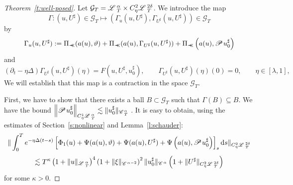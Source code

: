 \documentclass{amsart}
\newcommand{\assign}{:=}
\newcommand{\mathd}{\mathrm{d}}
\newcommand{\precprec}{\prec\!\!\!\prec}
\theoremstyle{remark}
\theoremstyle{definition}
\newcommand{\CC}{\mathscr{C} \hspace{.1em}}
\newcommand{\LL}{\mathscr{L} \hspace{.2em}}
\newcommand{\PP}{\mathscr{P} \hspace{.1em}}
\begin{document}
\begin{proof}[Theorem~\ref{t:well-posed}]
  Let $\mathcal{G}_T = \LL^{\alpha}_T \times C_{\eta}^2 \LL^{2 \delta}_T$. We
  introduce the map
  \[ \Gamma : (u, U^{\sharp}) \in \mathcal{G}_T \mapsto (\Gamma_u (u,
     U^{\sharp}), \Gamma_{U^{\sharp}} (u, U^{\sharp})) \in \mathcal{G}_T \]
  by
  \[ \Gamma_u (u, U^{\sharp}) \assign \Pi_{\precprec} (a (u), \vartheta) +
     \Pi_{\precprec} (a (u), \Gamma_{U^{\sharp}} (u, U^{\sharp})) +
     \Pi_{\precprec} \left( a (u), \PP u_0^{\sharp} \right) \]
  and
  \[ (\partial_t - \eta \Delta) \Gamma_{U^{\sharp}} (u, U^{\sharp}) (\eta) = F
     (u, U^{\sharp}, u_0^{\sharp}), \qquad \Gamma_{U^{\sharp}} (u, U^{\sharp})
     (\eta) (0) = 0, \qquad \eta \in [\lambda, 1], \]
  We will establish that this map is a contraction in the space $\mathcal{G}_T
  .$
  
  First, we have to show that there exists a ball $B \subset \mathcal{G}_T$
  such that $\Gamma (B) \subseteq B$. We have the bound $\left\| \PP
  u_0^{\sharp} \right\|_{C^1_{\eta} \LL^{\alpha}_T} \lesssim \| u^{\sharp}_0
  \|_{\CC^{\alpha}_T}$ . It is easy to obtain, using the estimates of
  Section~\ref{s:nonlinear} and Lemma~\ref{l:schauder}:
  \[ \| \int_0^T e^{- \eta \Delta (t - s)} \left[ \Phi_1 (u) + \Psi (a (u),
     \vartheta) + \Psi (a (u), U^{\sharp}) + \Psi \left( a (u), \PP
     u_0^{\sharp} \right) \right]_s \mathd s\|_{C^2_{\eta} \LL_T^{2 \delta}}
  \]
  \[ \lesssim T^{\kappa} \left( 1 + \| u \|_{\LL^{\alpha}_T} \right)^4 \left(
     1 + \| \xi \|_{\CC^{\alpha - 2}} \right)^2 \| u_0^{\sharp}
     \|_{\CC^{\alpha}} \left( 1 + \| U^{\sharp} \|_{C^2_{\eta} \LL^{2
     \delta}_T} \right) \]
  for some $\kappa > 0$.
  

\end{proof}
\end{document}
